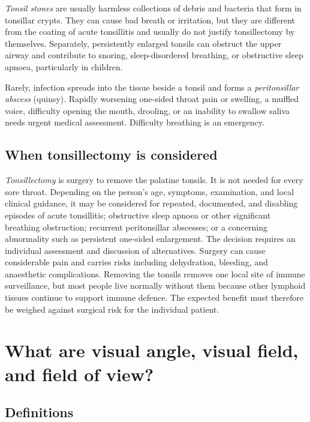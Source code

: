 \documentclass[11pt,oneside]{report}
\begin{document}
\emph{Tonsil stones} are usually harmless collections of debris and bacteria
that form in tonsillar crypts. They can cause bad breath or irritation, but they
are different from the coating of acute tonsillitis and usually do not justify
tonsillectomy by themselves. Separately, persistently enlarged tonsils can
obstruct the upper airway and contribute to snoring, sleep-disordered
breathing, or obstructive sleep apnoea, particularly in children.

Rarely, infection spreads into the tissue beside a tonsil and forms a
\emph{peritonsillar abscess} (quinsy). Rapidly worsening one-sided throat pain
or swelling, a muffled voice, difficulty opening the mouth, drooling, or an
inability to swallow saliva needs urgent medical assessment. Difficulty
breathing is an emergency.

\subsection*{When tonsillectomy is considered}

\emph{Tonsillectomy} is surgery to remove the palatine tonsils. It is not needed
for every sore throat. Depending on the person's age, symptoms, examination,
and local clinical guidance, it may be considered for repeated, documented, and
disabling episodes of acute tonsillitis; obstructive sleep apnoea or other
significant breathing obstruction; recurrent peritonsillar abscesses; or a
concerning abnormality such as persistent one-sided enlargement. The decision
requires an individual assessment and discussion of alternatives. Surgery can
cause considerable pain and carries risks including dehydration, bleeding, and
anaesthetic complications. Removing the tonsils removes one local site of
immune surveillance, but most people live normally without them because other
lymphoid tissues continue to support immune defence. The expected benefit must
therefore be weighed against surgical risk for the individual patient.

\section{What are visual angle, visual field, and field of view?}

\subsection*{Definitions}
\end{document}
